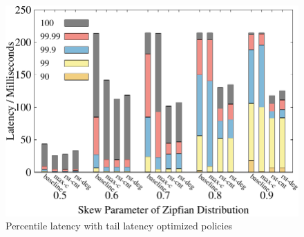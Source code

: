 \begin{figure}[t]
\begin{minipage}[b]{0.32\linewidth}
        \label{fig:restart:abort}
    \end{minipage}
    \begin{minipage}[b]{0.32\linewidth}
            \centering
            \includegraphics[width=\textwidth]{./exp_fig/restart/percent100_latency}
            \vspace{-2em}
            \caption{Percentile latency with tail latency optimized policies}
            \label{fig:restart:p100}
        \end{minipage}
\end{figure}

